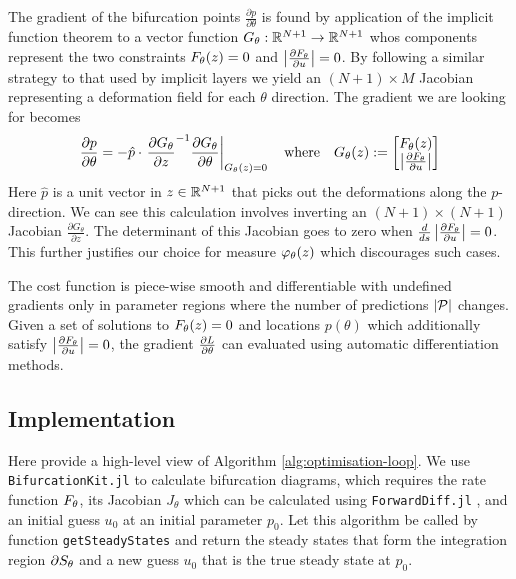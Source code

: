 The gradient of the bifurcation points $\frac{\partial p}{\partial\theta}$ is found by application of the implicit function theorem to a vector function $G_{\theta}:\mathbb{R}^{N+1}\rightarrow\mathbb{R}^{N+1}$ whos components represent the two constraints $F_{\theta}(z)=0$ and $\left| \frac{\partial F_{\theta}}{\partial u} \right|=0$. By following a similar strategy to that used by implicit layers \cite{Look2020DifferentiableLayers} we yield an $(N+1)\times M$ Jacobian representing a deformation field \cite{Jos2011OnSurface} for each $\theta$ direction. The gradient we are looking for becomes
\begin{align}
    \frac{\partial p}{\partial\theta} = -\hat{p}\cdot\left.\frac{\partial G_{\theta}}{\partial z}^{-1}
    \frac{\partial  G_{\theta}}{\partial\theta}\right|_{G_{\theta}(z)=0}
    \quad\mathrm{where}\quad
    G_{\theta}(z):=\begin{bmatrix}F_{\theta}(z)\\\left| \frac{\partial F_{\theta}}{\partial u} \right|\end{bmatrix}
\end{align}
Here $\hat{p}$ is a unit vector in $z\in\mathbb{R}^{N+1}$ that picks out the deformations along the $p$-direction. We can see this calculation involves inverting an $(N+1)\times(N+1)$ Jacobian $\frac{\partial G_{\theta}}{\partial z}$. The determinant of this Jacobian goes to zero when $\frac{d}{ds}\left| \frac{\partial F_{\theta}}{\partial u} \right|=0$. This further justifies our choice for measure $\varphi_{\theta}(z)$ which discourages such cases.

The cost function is piece-wise smooth and differentiable with undefined gradients only in parameter regions where the number of predictions $|\mathcal{P}|$ changes. Given a set of solutions to $F_{\theta}(z)=0$ and locations $p(\theta)$ which additionally satisfy $\left| \frac{\partial F_{\theta}}{\partial u} \right|=0$, the gradient $\frac{\partial L}{\partial\theta}$ can evaluated using automatic differentiation methods.

\subsection{Implementation}
\label{section:implementation}
Here provide a high-level view of Algorithm \ref{alg:optimisation-loop}. We use \texttt{BifurcationKit.jl} \cite{Veltz2019PseudoArcLengthContinuation.jl} to calculate bifurcation diagrams, which requires the rate function $F_{\theta}$, its Jacobian $J_\theta$ which can be calculated using \texttt{ForwardDiff.jl} \cite{Revels2016Forward-ModeJulia}, and an initial guess $u_0$ at an initial parameter $p_0$. Let this algorithm be called by function \texttt{getSteadyStates} and return the steady states that form the integration region $\partial S_{\theta}$ and a new guess $u_0$ that is the true steady state at $p_0$.

